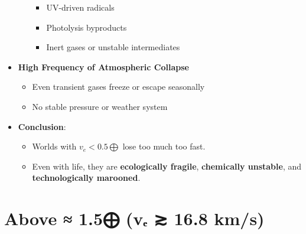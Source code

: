 \documentclass[
  letterpaper,
]{book}
\providecommand{\tightlist}{%
  \setlength{\itemsep}{0pt}\setlength{\parskip}{0pt}}
\begin{document}
\begin{itemize}
\begin{itemize}
    \begin{itemize}
    \tightlist
    \item
      UV-driven radicals
    \item
      Photolysis byproducts
    \item
      Inert gases or unstable intermediates
    \end{itemize}
  \end{itemize}
\item
  \textbf{High Frequency of Atmospheric Collapse}

  \begin{itemize}
  \tightlist
  \item
    Even transient gases freeze or escape seasonally
  \item
    No stable pressure or weather system
  \end{itemize}
\item
  \textbf{Conclusion}:

  \begin{itemize}
  \tightlist
  \item
    Worlds with \(v_e < 0.5⨁\) lose too much too fast.\\
  \item
    Even with life, they are \textbf{ecologically fragile},
    \textbf{chemically unstable}, and \textbf{technologically marooned}.
  \end{itemize}
\end{itemize}

\section{Above ≈ 1.5⨁ (vₑ ≳ 16.8
km/s)}\label{above-1.5-vux2091-16.8-kms}
\end{document}
